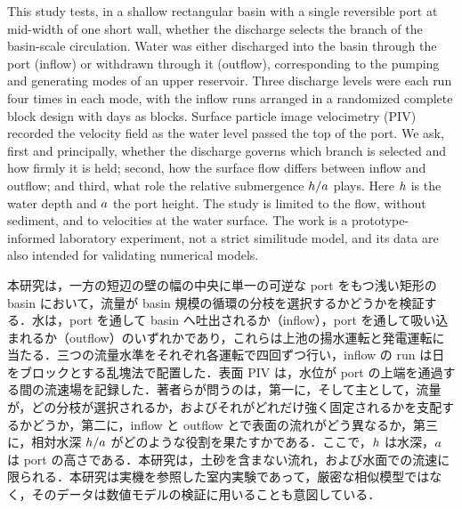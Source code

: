 \begin{en}[I-6]
This study tests, in a shallow rectangular basin with a single reversible port at mid-width of one short wall, whether the discharge selects the branch of the basin-scale circulation. Water was either discharged into the basin through the port (inflow) or withdrawn through it (outflow), corresponding to the pumping and generating modes of an upper reservoir. Three discharge levels were each run four times in each mode, with the inflow runs arranged in a randomized complete block design with days as blocks. Surface particle image velocimetry (PIV) recorded the velocity field as the water level passed the top of the port. We ask, first and principally, whether the discharge governs which branch is selected and how firmly it is held; second, how the surface flow differs between inflow and outflow; and third, what role the relative submergence $h/a$ plays. Here $h$ is the water depth and $a$ the port height. The study is limited to the flow, without sediment, and to velocities at the water surface. The work is a prototype-informed laboratory experiment, not a strict similitude model, and its data are also intended for validating numerical models.
\end{en}
\begin{ja}
本研究は，一方の短辺の壁の幅の中央に単一の可逆な port をもつ浅い矩形の basin において，流量が basin 規模の循環の分枝を選択するかどうかを検証する．水は，port を通して basin へ吐出されるか（inflow），port を通して吸い込まれるか（outflow）のいずれかであり，これらは上池の揚水運転と発電運転に当たる．三つの流量水準をそれぞれ各運転で四回ずつ行い，inflow の run は日をブロックとする乱塊法で配置した．表面 PIV は，水位が port の上端を通過する間の流速場を記録した．著者らが問うのは，第一に，そして主として，流量が，どの分枝が選択されるか，およびそれがどれだけ強く固定されるかを支配するかどうか，第二に，inflow と outflow とで表面の流れがどう異なるか，第三に，相対水深 $h/a$ がどのような役割を果たすかである．ここで，$h$ は水深，$a$ は port の高さである．本研究は，土砂を含まない流れ，および水面での流速に限られる．本研究は実機を参照した室内実験であって，厳密な相似模型ではなく，そのデータは数値モデルの検証に用いることも意図している．
\end{ja}

